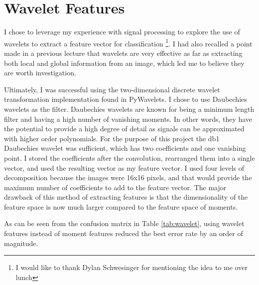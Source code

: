 \documentclass[12pt]{article}
\begin{document}
\clearpage

\section{Wavelet Features}
I chose to leverage my experience with signal processing to explore the use of
wavelets to extract a feature vector for classification \footnote{I would like
to thank Dylan Schwesinger for mentioning the idea to me over lunch}. I had
also recalled a point made in a previous lecture that wavelets are very
effective as far as extracting both local and global information from an image,
which led me to believe they are worth investigation.

Ultimately, I was successful using the two-dimensional discrete wavelet
transformation implementation found in PyWavelets\cite{website:pywt}. I chose
to use Daubechies wavelets as the filter. Daubechies wavelets are known for
being a minimum length filter and having a high number of vanishing moments. In
other words, they have the potential to provide a high degree of detail as
signals can be approximated with higher order polynomials. For the purpose of
this project the db1 Daubechies wavelet was sufficient, which has two
coefficients and one vanishing point. I stored the coefficients after the
convolution, rearranged them into a single vector, and used the resulting
vector as my feature vector. I used four levels of decomposition because the
images were 16x16 pixels, and that would provide the maximum number of
coefficients to add to the feature vector. The major drawback of this method of
extracting features is that the dimensionality of the feature space is now much
larger compared to the feature space of moments.

As can be seen from the confusion matrix in Table \ref{tab:wavelet}, using
wavelet features instead of moment features reduced the best error rate by an
order of magnitude.
\end{document}
